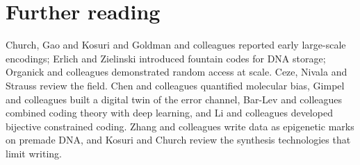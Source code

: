 \section*{Further reading}
Church, Gao and Kosuri\cite{Church2012} and Goldman and colleagues\cite{Goldman2013}
reported early large-scale encodings; Erlich and Zielinski introduced fountain
codes for DNA storage;\cite{ErlichZielinski2017} Organick and colleagues
demonstrated random access at scale.\cite{Organick2018} Ceze, Nivala and Strauss
review the field.\cite{Ceze2019} Chen and colleagues quantified molecular
bias,\cite{Chen2020bias} Gimpel and colleagues built a digital twin of the error
channel,\cite{Gimpel2023} Bar-Lev and colleagues combined coding theory with deep
learning,\cite{BarLev2025} and Li and colleagues developed bijective constrained
coding.\cite{Li2026} Zhang and colleagues write data as epigenetic marks on
premade DNA,\cite{ZhangC2024} and Kosuri and Church review the synthesis
technologies that limit writing.\cite{Kosuri2014}
